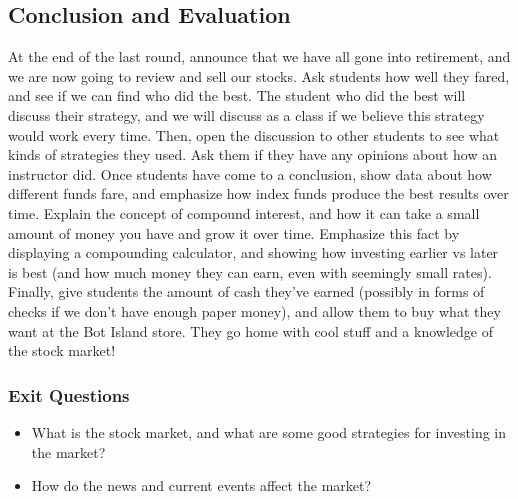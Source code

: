\documentclass{lessonplan}
\begin{document}
    \subsection{Conclusion and Evaluation}
      At the end of the last round, announce that we have all gone into retirement, and we are now going to review
      and sell our stocks. Ask students how well they fared, and see if we can find who did the best. The student
      who did the best will discuss their strategy, and we will discuss as a class if we believe this strategy would
      work every time. Then, open the discussion to other students to see what kinds of strategies they used.
      Ask them if they have any opinions about how an instructor did. Once students have come to a conclusion,
      show data about how different funds fare, and emphasize how index funds produce the best results over
      time. Explain the concept of compound interest, and how it can take a small amount of money you have
      and grow it over time. Emphasize this fact by displaying a compounding calculator, and showing how 
      investing earlier vs later is best (and how much money they can earn, even with seemingly small rates).
      Finally, give students the amount of cash they've earned (possibly in forms of checks if we don't have
      enough paper money), and allow them to buy what they want at the Bot Island store.
      They go home with cool stuff and a knowledge of the stock market!
      \subsubsection{Exit Questions}
      \begin{itemize}
        \item What is the stock market, and what are some good strategies for investing in the market?
	\item How do the news and current events affect the market?
      \end{itemize}
\end{document}
